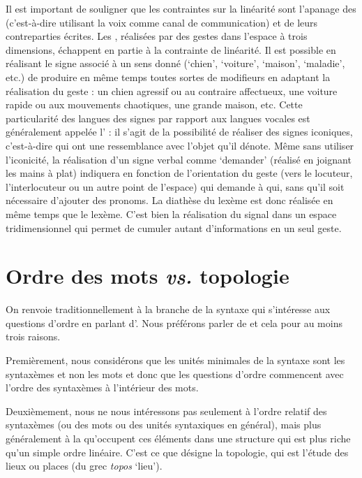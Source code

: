 {     Il est important de souligner que les contraintes sur la linéarité sont l’apanage des  (c’est-à-dire utilisant la voix comme canal de communication) et de leurs contreparties écrites. Les , réalisées par des gestes dans l’espace à trois dimensions, échappent en partie à la contrainte de linéarité. Il est possible en réalisant le signe associé à un sens donné (‘chien’, ‘voiture’, ‘maison’, ‘maladie’, etc.) de produire en même temps toutes sortes de modifieurs en adaptant la réalisation du geste : un chien agressif ou au contraire affectueux, une voiture rapide ou aux mouvements chaotiques, une grande maison, etc. Cette particularité des langues des signes par rapport aux langues vocales est généralement appelée l’ : il s’agit de la possibilité de réaliser des signes iconiques, c’est-à-dire qui ont une ressemblance avec l’objet qu’il dénote. Même sans utiliser l’iconicité, la réalisation d’un signe verbal comme ‘demander’ (réalisé en joignant les mains à plat) indiquera en fonction de l’orientation du geste (vers le locuteur, l’interlocuteur ou un autre point de l’espace) qui demande à qui, sans qu’il soit nécessaire d’ajouter des pronoms. La diathèse du lexème est donc réalisée en même temps que le lexème. C’est bien la réalisation du signal dans un espace tridimensionnel qui permet de cumuler autant d’informations en un seul geste.
}
\section{Ordre des mots \textit{vs.} topologie}\label{sec:3.5.2}

On renvoie traditionnellement à la branche de la syntaxe qui s’intéresse aux questions d’ordre en parlant d’. Nous préférons parler de  et cela pour au moins trois raisons.

Premièrement, nous considérons que les unités minimales de la syntaxe sont les syntaxèmes et non les mots et donc que les questions d’ordre commencent avec l’ordre des syntaxèmes à l’intérieur des mots.

Deuxièmement, nous ne nous intéressons pas seulement à l’ordre relatif des syntaxèmes (ou des mots ou des unités syntaxiques en général), mais plus généralement à la  qu’occupent ces éléments dans une structure qui est plus riche qu’un simple ordre linéaire. C’est ce que désigne la topologie, qui est l’étude des lieux ou places (du grec \textit{topos} ‘lieu’).

